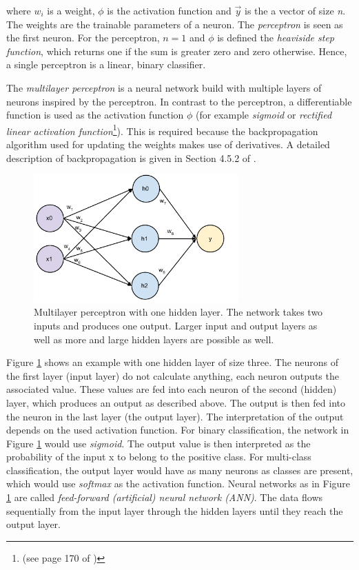 where $w_i$ is a weight, $\phi$ is the activation function and $\vec{y}$ is the a vector of size \emph{n}. The weights are the trainable parameters of a neuron. The \emph{perceptron} is seen as the first neuron. For the perceptron, $n=1$ and $\phi$ is defined the \emph{heaviside step function}, which returns one if the sum is greater zero and zero otherwise. Hence, a single perceptron is a linear, binary classifier.

The \emph{multilayer perceptron} is a neural network build with multiple layers of neurons inspired by the perceptron. In contrast to the perceptron, a differentiable function is used as the activation function $\phi$ (for example \emph{sigmoid} or  \emph{rectiﬁed linear activation function}\footnote{(see page 170 of \cite{Goodfellow-et-al-2016})}). This is required because the backpropagation algorithm used for updating the weights makes use of derivatives. A detailed description of backpropagation is given in Section 4.5.2 of \cite{mitchell1997machine}.





\begin{figure}[ht]
\centering
	\includegraphics[width=0.7\textwidth]{images/nn}
	\caption{Multilayer perceptron with one hidden layer. The network takes two inputs and produces one output. Larger input and output layers as well as more and large hidden layers are possible as well.}
		\label{fig:nn}
\end{figure}   


Figure \ref{fig:nn} shows an example with one hidden layer of size three. The neurons of the first layer (input layer) do not calculate anything, each neuron outputs the associated value. These values are fed into each neuron of the second (hidden) layer, which produces an output as described above. The output is then fed into the neuron in the last layer (the output layer). The interpretation of the output depends on the used activation function. For binary classification, the network in Figure \ref{fig:nn} would use \emph{sigmoid}. The output value is then interpreted as the probability of the input x to belong to the positive class. For multi-class classification, the output layer would have as many neurons as classes are present, which would use \emph{softmax} as the activation function. Neural networks as in Figure \ref{fig:nn} are called \emph{feed-forward (artificial) neural network (ANN)}. The data flows sequentially from the input layer through the hidden layers until they reach the output layer. 


